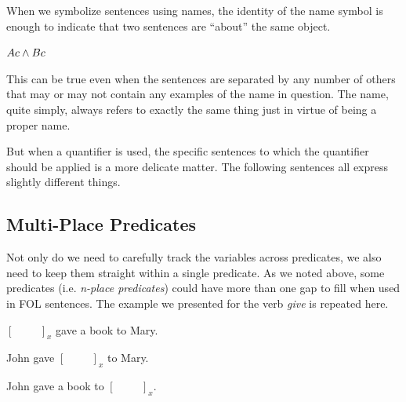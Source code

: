 When we symbolize sentences using names, the identity of the name symbol is
enough to indicate that two sentences are ``about'' the same object.

\begin{argument}
  \item[ ] $Ac\wedge Bc$
\end{argument}

This can be true even when the sentences are separated by any number of others
that may or may not contain any examples of the name in question. The name,
quite simply, always refers to exactly the same thing just in virtue of being a
proper name. 

But when a quantifier is used, the specific sentences to which the quantifier
should be applied is a more delicate matter. The following sentences all express
slightly different things.


\subsection{Multi-Place Predicates}

Not only do we need to carefully track the variables across predicates, we also
need to keep them straight within a single predicate. As we noted above, some
predicates (i.e. \emph{n-place predicates}) could have more than one gap to fill
when used in FOL sentences. The example we presented for the verb \emph{give} is
repeated here.

\begin{argument}
\item[ ] $[\hspace{1cm}]_x$ gave a book to Mary.
\item[ ] John gave $[\hspace{1cm}]_x$ to Mary.
\item[ ] John gave a book to $[\hspace{1cm}]_x$.  
\end{argument}

